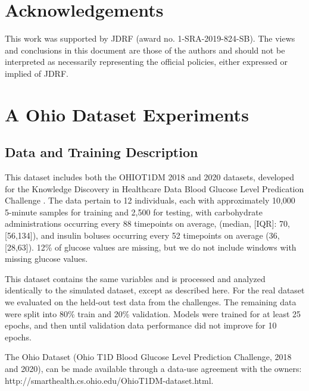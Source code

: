 \documentclass[letterpaper]{article}
\begin{document}
\section*{Acknowledgements} This work was supported by JDRF (award no. 1-SRA-2019-824-SB).  The views and conclusions in this document are those of the authors and should not be interpreted as necessarily representing the official policies, either expressed or implied of JDRF.



\clearpage
\newpage

\appendix











\section{A Ohio Dataset Experiments}

\subsection{Data and Training Description}

This dataset includes both the OHIOT1DM 2018 and 2020 datasets, developed for the Knowledge Discovery in Healthcare Data Blood Glucose Level Predication Challenge \cite{kn:oc2}. The data pertain to 12 individuals, each with approximately 10,000 5-minute samples for training and 2,500 for testing, with carbohydrate administrations occurring every 88 timepoints on average, (median, [IQR]: 70, [56,134]), and insulin boluses occurring every 52 timepoints on average (36, [28,63]). 12\% of glucose values are missing, but we do not include windows with missing glucose values.

This dataset contains the same variables and is processed and analyzed identically to the simulated dataset, except as described here. For the real dataset we evaluated on the held-out test data from the challenges.  The remaining data were split into 80\% train and 20\% validation. Models were trained for at least 25 epochs, and then until validation data performance did not improve for 10 epochs.

The Ohio Dataset (Ohio T1D Blood Glucose Level Prediction Challenge, 2018 and 2020), can be made available through a data-use agreement with the owners: http://smarthealth.cs.ohio.edu/OhioT1DM-dataset.html.
\end{document}

